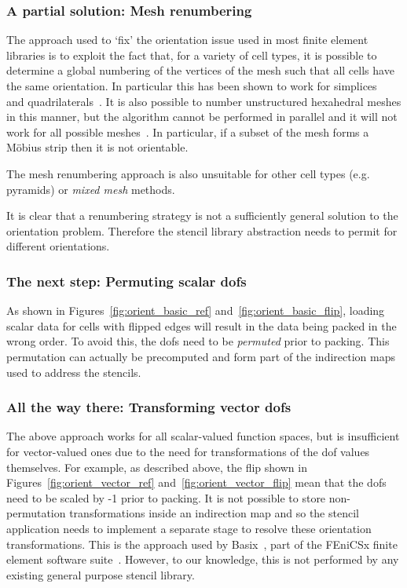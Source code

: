 \subsubsection{A partial solution: Mesh renumbering}

The approach used to `fix' the orientation issue used in most finite element libraries is to exploit the fact that, for a variety of cell types, it is possible to determine a global numbering of the vertices of the mesh such that all cells have the same orientation.
In particular this has been shown to work for simplices~\cite{rognesEfficientAssemblyDiv2010} and quadrilaterals~\cite{agelekOrientingEdgesUnstructured2017,homolyaParallelEdgeOrientation2016}.
It is also possible to number unstructured hexahedral meshes in this manner, but the algorithm cannot be performed in parallel and it will not work for all possible meshes~\cite{agelekOrientingEdgesUnstructured2017}.
In particular, if a subset of the mesh forms a Möbius strip then it is not orientable.

The mesh renumbering approach is also unsuitable for other cell types (e.g. pyramids) or \textit{mixed mesh} methods.

It is clear that a renumbering strategy is not a sufficiently general solution to the orientation problem.
Therefore the stencil library abstraction needs to permit for different orientations.

\subsubsection{The next step: Permuting scalar \glspl{dof}}

As shown in Figures~\ref{fig:orient_basic_ref} and~\ref{fig:orient_basic_flip}, loading scalar data for cells with flipped edges will result in the data being packed in the wrong order.
To avoid this, the \glspl{dof} need to be \textit{permuted} prior to packing.
This permutation can actually be precomputed and form part of the indirection maps used to address the stencils.

\subsubsection{All the way there: Transforming vector \glspl{dof}}

The above approach works for all scalar-valued function spaces, but is insufficient for vector-valued ones due to the need for transformations of the \gls{dof} values themselves.
For example, as described above, the flip shown in Figures~\ref{fig:orient_vector_ref} and~\ref{fig:orient_vector_flip} mean that the \glspl{dof} need to be scaled by -1 prior to packing.
It is not possible to store non-permutation transformations inside an indirection map and so the stencil application needs to implement a separate stage to resolve these orientation transformations.
This is the approach used by Basix~\cite{scroggsConstructionArbitraryOrder2021,scroggsBasixRuntimeFinite2022}, part of the FEniCSx finite element software suite~\cite{loggAutomatedSolutionDifferential2012,AlnaesBlechta2015a}.
However, to our knowledge, this is not performed by any existing general purpose stencil library.

